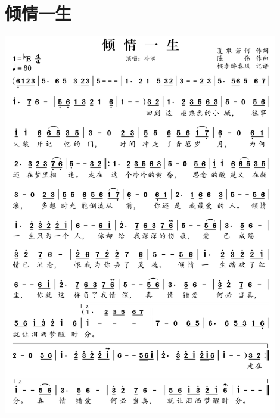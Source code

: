\documentclass[cn,pad,twocol]{elegantbook}
\begin{document}
\section{倾情一生} \includegraphics[width=0.9\textwidth]{rpi400/20210212倾情一生.png}
\end{document}
